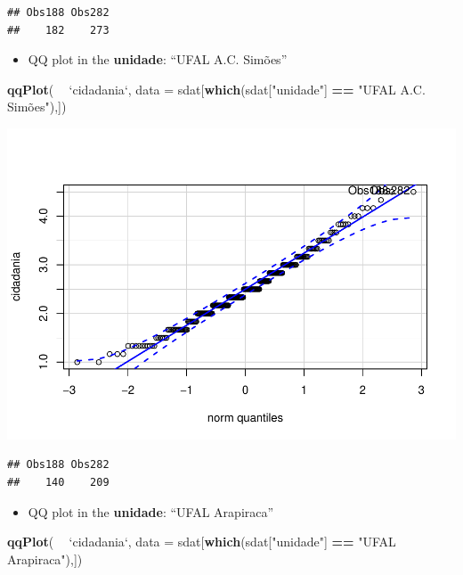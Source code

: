 \documentclass[]{article}
\newenvironment{Shaded}{\begin{snugshade}}{\end{snugshade}}
\newcommand{\DataTypeTok}[1]{\textcolor[rgb]{0.13,0.29,0.53}{#1}}
\newcommand{\KeywordTok}[1]{\textcolor[rgb]{0.13,0.29,0.53}{\textbf{#1}}}
\newcommand{\NormalTok}[1]{#1}
\newcommand{\OperatorTok}[1]{\textcolor[rgb]{0.81,0.36,0.00}{\textbf{#1}}}
\newcommand{\StringTok}[1]{\textcolor[rgb]{0.31,0.60,0.02}{#1}}
\providecommand{\tightlist}{%
  \setlength{\itemsep}{0pt}\setlength{\parskip}{0pt}}
\begin{document}
\begin{verbatim}
## Obs188 Obs282 
##    182    273
\end{verbatim}

\begin{itemize}
\tightlist
\item
  QQ plot in the \textbf{unidade}: ``UFAL A.C. Simões''
\end{itemize}

\begin{Shaded}
\begin{Highlighting}[]
\KeywordTok{qqPlot}\NormalTok{( }\OperatorTok{~}\StringTok{ `}\DataTypeTok{cidadania}\StringTok{`}\NormalTok{, }\DataTypeTok{data =}\NormalTok{ sdat[}\KeywordTok{which}\NormalTok{(sdat[}\StringTok{"unidade"}\NormalTok{] }\OperatorTok{==}\StringTok{ "UFAL A.C. Simões"),])}
\end{Highlighting}
\end{Shaded}

\includegraphics{factorialAnova_files/figure-latex/unnamed-chunk-17-1.pdf}

\begin{verbatim}
## Obs188 Obs282 
##    140    209
\end{verbatim}

\begin{itemize}
\tightlist
\item
  QQ plot in the \textbf{unidade}: ``UFAL Arapiraca''
\end{itemize}

\begin{Shaded}
\begin{Highlighting}[]
\KeywordTok{qqPlot}\NormalTok{( }\OperatorTok{~}\StringTok{ `}\DataTypeTok{cidadania}\StringTok{`}\NormalTok{, }\DataTypeTok{data =}\NormalTok{ sdat[}\KeywordTok{which}\NormalTok{(sdat[}\StringTok{"unidade"}\NormalTok{] }\OperatorTok{==}\StringTok{ "UFAL Arapiraca"}\NormalTok{),])}
\end{Highlighting}
\end{Shaded}
\end{document}
